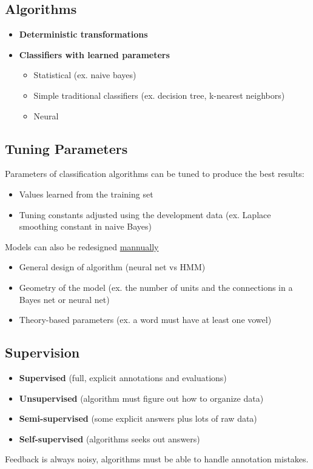   \subsection{Algorithms}

    \begin{itemize}
      \item \textbf{Deterministic transformations}
      \item \textbf{Classifiers with learned parameters}
      \begin{itemize}
        \item Statistical (ex. naive bayes)
        \item Simple traditional classifiers (ex. decision tree, k-nearest neighbors)
        \item Neural
      \end{itemize}
    \end{itemize}

  \subsection{Tuning Parameters}

    Parameters of classification algorithms can be tuned to produce the
    best results:

    \begin{itemize}
      \item Values learned from the training set
      \item Tuning constants adjusted using the development data
      (ex. Laplace smoothing constant in naive Bayes)
    \end{itemize}

    Models can also be redesigned \ul{mannually}

    \begin{itemize}
      \item General design of algorithm (neural net vs HMM)
      \item Geometry of the model (ex. the number of units and
      the connections in a Bayes net or neural net)
      \item Theory-based parameters (ex. a word must have at least one vowel)
    \end{itemize}

  \subsection{Supervision}

    \begin{itemize}
      \item \textbf{Supervised} (full, explicit annotations and evaluations)
      \item \textbf{Unsupervised} (algorithm must figure out how to organize data)
      \item \textbf{Semi-supervised} (some explicit answers plus lots of raw data)
      \item \textbf{Self-supervised} (algorithms seeks out answers)
    \end{itemize}

    Feedback is always noisy, algorithms must be able to handle annotation
    mistakes.